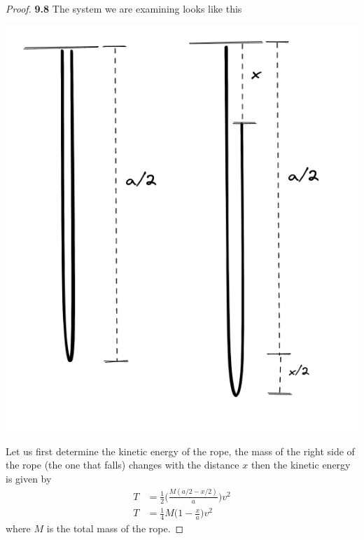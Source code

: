 \documentclass[11pt]{article}
\theoremstyle{definition}
\begin{document}
    \begin{proof}{\textbf{9.8}}
        The system we are examining looks like this
        \begin{center}
            \includegraphics[scale=0.4]{ch9-8.png}
        \end{center}
        Let us first determine the kinetic energy of the rope, the mass of the
        right side of the rope (the one that falls) changes with the distance
        $x$ then the kinetic energy is given by
        \begin{align*}
            T &= \frac{1}{2}\Bigg(\frac{M(a/2 - x/2)}{a}\Bigg)v^2\\
            T &= \frac{1}{4}M\Bigg(1 - \frac{x}{a}\Bigg)v^2
        \end{align*}
        where $M$ is the total mass of the rope.


\end{proof}
\end{document}
